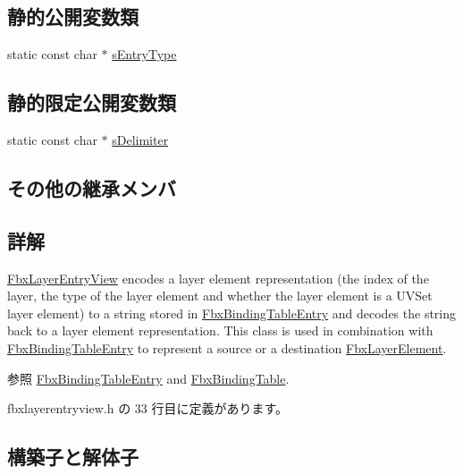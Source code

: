 \subsection*{静的公開変数類}
\begin{DoxyCompactItemize}
\item 
static const char $\ast$ \hyperlink{class_fbx_layer_entry_view_aa8222d7ad3155f8e83652e030ab22e91}{s\+Entry\+Type}
\end{DoxyCompactItemize}
\subsection*{静的限定公開変数類}
\begin{DoxyCompactItemize}
\item 
static const char $\ast$ \hyperlink{class_fbx_layer_entry_view_a2143b40ee433ec7138342298b0cf76f3}{s\+Delimiter}
\end{DoxyCompactItemize}
\subsection*{その他の継承メンバ}


\subsection{詳解}
\hyperlink{class_fbx_layer_entry_view}{Fbx\+Layer\+Entry\+View} encodes a layer element representation (the index of the layer, the type of the layer element and whether the layer element is a U\+V\+Set layer element) to a string stored in \hyperlink{class_fbx_binding_table_entry}{Fbx\+Binding\+Table\+Entry} and decodes the string back to a layer element representation. This class is used in combination with \hyperlink{class_fbx_binding_table_entry}{Fbx\+Binding\+Table\+Entry} to represent a source or a destination \hyperlink{class_fbx_layer_element}{Fbx\+Layer\+Element}. \begin{DoxySeeAlso}{参照}
\hyperlink{class_fbx_binding_table_entry}{Fbx\+Binding\+Table\+Entry} and \hyperlink{class_fbx_binding_table}{Fbx\+Binding\+Table}. 
\end{DoxySeeAlso}


 fbxlayerentryview.\+h の 33 行目に定義があります。



\subsection{構築子と解体子}
\mbox{\label{class_fbx_layer_entry_view_a7c5fc0472d0b3d60d0207acc80751daf}} 
